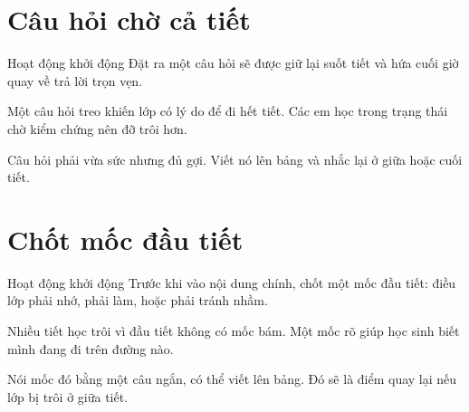 \section{Câu hỏi chờ cả tiết}
\begin{khoidongbox}{Hoạt động khởi động}
Đặt ra một câu hỏi sẽ được giữ lại suốt tiết và hứa cuối giờ quay về trả lời trọn vẹn.
\end{khoidongbox}
\begin{visaohieuqua}
Một câu hỏi treo khiến lớp có lý do để đi hết tiết. Các em học trong trạng thái chờ kiểm chứng nên đỡ trôi hơn.
\end{visaohieuqua}
\begin{cachlam5phut}
Câu hỏi phải vừa sức nhưng đủ gợi. Viết nó lên bảng và nhắc lại ở giữa hoặc cuối tiết.
\end{cachlam5phut}
\ngancach

\section{Chốt mốc đầu tiết}
\begin{khoidongbox}{Hoạt động khởi động}
Trước khi vào nội dung chính, chốt một mốc đầu tiết: điều lớp phải nhớ, phải làm, hoặc phải tránh nhầm.
\end{khoidongbox}
\begin{visaohieuqua}
Nhiều tiết học trôi vì đầu tiết không có mốc bám. Một mốc rõ giúp học sinh biết mình đang đi trên đường nào.
\end{visaohieuqua}
\begin{cachlam5phut}
Nói mốc đó bằng một câu ngắn, có thể viết lên bảng. Đó sẽ là điểm quay lại nếu lớp bị trôi ở giữa tiết.
\end{cachlam5phut}